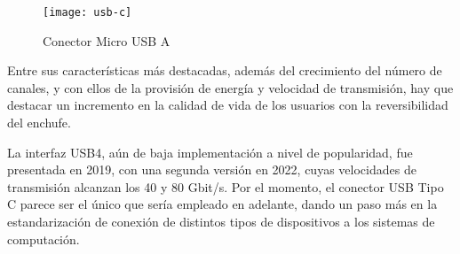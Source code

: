 \documentclass[12pt]{article}
\begin{document}
\begin{figure}[h]
	\vspace{20pt}
	\centering
	\texttt{[image: usb-c]}
	\caption{Conector Micro USB A}
	\vspace{15pt}
\end{figure}

Entre sus características más destacadas, además del crecimiento del número de canales,
y con ellos de la provisión de energía y velocidad de transmisión,
hay que destacar un incremento en la calidad de vida de los usuarios con la reversibilidad del enchufe.

La interfaz USB4, aún de baja implementación a nivel de popularidad,
fue presentada en 2019,
con una segunda versión en 2022,
cuyas velocidades de transmisión alcanzan los 40 y 80 Gbit/s.
Por el momento,
el conector USB Tipo C parece ser el único que sería empleado en adelante,
dando un paso más en la estandarización de conexión de distintos tipos de dispositivos a los sistemas de computación.

\printbibliography[heading=bibnumbered]
\end{document}
